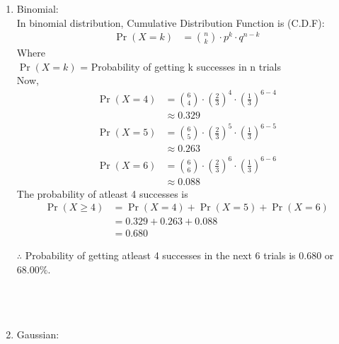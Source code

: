 \documentclass[journal,12pt,onecolumn]{article}
\providecommand{\pr}[1]{\ensuremath{\Pr\left(#1\right)}}
\theoremstyle{remark}
\begin{document}
\begin{enumerate}
	\item{Binomial:}\\
		In binomial distribution, Cumulative Distribution Function is (C.D.F):\\
		\begin{align}
			\pr{X=k} &=  \binom{n}{k}\cdot p^{k}\cdot q^{n-k}
		\end{align}
		Where\\ $\pr{X=k}$ = Probability of getting k successes in n trials\\
		Now,
		\begin{align}
			\pr{X=4}&=\binom{6}{4}\cdot \left(\frac{2}{3}\right)^{4}\cdot \left(\frac{1}{3}\right)^{6-4}\\
			&\approx 0.329\\
			\pr{X=5}&=\binom{6}{5}\cdot \left(\frac{2}{3}\right)^{5}\cdot \left(\frac{1}{3}\right)^{6-5}\\
			&\approx 0.263\\
			\pr{X=6}&=\binom{6}{6}\cdot \left(\frac{2}{3}\right)^{6}\cdot \left(\frac{1}{3}\right)^{6-6}\\
			&\approx 0.088
		\end{align}
		The probability of atleast 4 successes is
		\begin{align}
			\pr{X\geq4} &= \pr{X=4} + \pr{X=5} + \pr{X=6}\\
			&= 0.329 + 0.263 + 0.088\\
			&= 0.680
		\end{align}
	
$\therefore$ Probability of getting atleast 4 successes in the next 6 trials is $0.680$ or $68.00\%$.  \\ \\ \\ \\
	\item{Gaussian:}\\


\end{enumerate}
\end{document}
